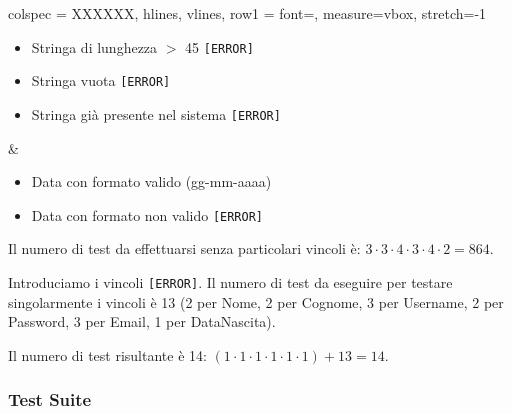 \begin{table}[!hbp]
\begin{tblr}{
		colspec = XXXXXX,
		hlines, vlines,
		row{1} = {font=\bfseries},
		measure=vbox, stretch=-1
		}
\begin{itemize}[leftmargin=*]
			\item Stringa di lunghezza $>$ 45 \texttt{[ERROR]}
			\item Stringa vuota \texttt{[ERROR]}
			\item Stringa già presente nel sistema \texttt{[ERROR]}
		\end{itemize} &
		\begin{itemize}[leftmargin=*]
			\item Data con formato valido (gg-mm-aaaa)
			\item Data con formato non valido \texttt{[ERROR]}
		\end{itemize}
	\end{tblr}
\end{table}

\noindent Il numero di test da effettuarsi senza particolari vincoli è: $3 \cdot 3 \cdot 4 \cdot 3 \cdot 4 \cdot 2 = 864$.

\noindent Introduciamo i vincoli \texttt{[ERROR]}. Il numero di test da eseguire per testare singolarmente i vincoli è 13 (2 per Nome, 2 per Cognome, 3 per Username, 2 per Password, 3 per Email, 1 per DataNascita).

\noindent Il numero di test risultante è 14: $(1 \cdot 1 \cdot 1 \cdot 1 \cdot 1 \cdot 1) + 13 = 14$.

\subsubsection*{Test Suite}

